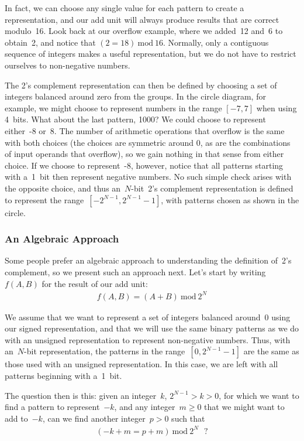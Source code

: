 In fact, we can choose any single value for each pattern to create a 
representation, and our add unit will always produce results that
are correct modulo~16.  Look back at our overflow example, where
we added~12 and~6 to obtain~2, and notice that $(2=18)~\mbox{mod}~16$.
Normally, only a contiguous sequence of integers makes a useful
representation, but we do not have to restrict ourselves to 
non-negative numbers.

The 2's complement representation can then be defined by choosing a 
set of integers balanced around zero from the groups.  In the circle 
diagram, for example, we might choose to represent numbers
in the range $[-7,7]$ when using 4~bits.  What about the last pattern, 1000?
We could choose to represent either~-8 or~8.  The number of arithmetic
operations that overflow is the same with both choices (the choices
are symmetric around 0, as are the combinations of input operands that 
overflow), so we gain nothing in that sense from either choice.
If we choose to represent~-8, however, notice that all patterns starting
with a~1~bit then represent negative numbers.  No such simple check
arises with the opposite choice, and thus an~\mbox{$N$-bit}~2's complement 
representation is defined to represent the range~$[-2^{N-1},2^{N-1}-1]$,
with patterns chosen as shown in the circle.\\

\subsubsection{An Algebraic Approach}

Some people prefer an algebraic approach to understanding the
definition of~2's complement, so we present such an approach next.
Let's start by writing $f(A,B)$ for the result of our add unit:
%
\begin{eqnarray*}
f(A,B) = (A + B)~\mbox{mod}~2^N
\end{eqnarray*}

We assume that we want to represent a set of integers balanced around~0
using our signed representation, and that we will use the same binary
patterns as we do with an unsigned representation to represent
non-negative numbers.  Thus, with an~\mbox{$N$-bit} representation,
the patterns in the range~$[0,2^{N-1}-1]$ are the same as those
used with an unsigned representation.  In this case, we are left with
all patterns beginning with a~1~bit.

The question then is this: given an integer~$k$, $2^{N-1}>k>0$, for which we 
want to find a pattern to represent~$-k$, and any integer~$m\geq{0}$
that we might want to add to~$-k$, 
can we find another integer~$p>0$
such that 
%
\begin{eqnarray}
(-k + m = p + m)~\mbox{mod}~2^N~~~?\label{eqn:basealg}
\end{eqnarray}

